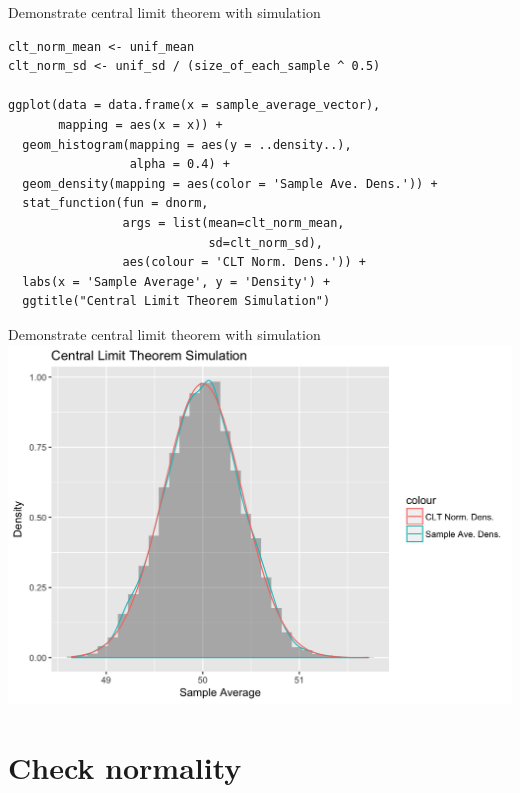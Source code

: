 \documentclass[12pt, t, xcolor=dvipsnames]{beamer}
\begin{document}
\begin{frame}[fragile]{Demonstrate central limit theorem with simulation}

\begin{verbatim}
clt_norm_mean <- unif_mean
clt_norm_sd <- unif_sd / (size_of_each_sample ^ 0.5)

ggplot(data = data.frame(x = sample_average_vector), 
       mapping = aes(x = x)) +
  geom_histogram(mapping = aes(y = ..density..), 
                 alpha = 0.4) +
  geom_density(mapping = aes(color = 'Sample Ave. Dens.')) +
  stat_function(fun = dnorm, 
                args = list(mean=clt_norm_mean, 
                            sd=clt_norm_sd), 
                aes(colour = 'CLT Norm. Dens.')) + 
  labs(x = 'Sample Average', y = 'Density') + 
  ggtitle("Central Limit Theorem Simulation")
\end{verbatim}

\end{frame}


\begin{frame}{Demonstrate central limit theorem with simulation}
  \includegraphics[height=\textheight, keepaspectratio]{cltsim}
\end{frame}


\section{Check normality}
\end{document}

